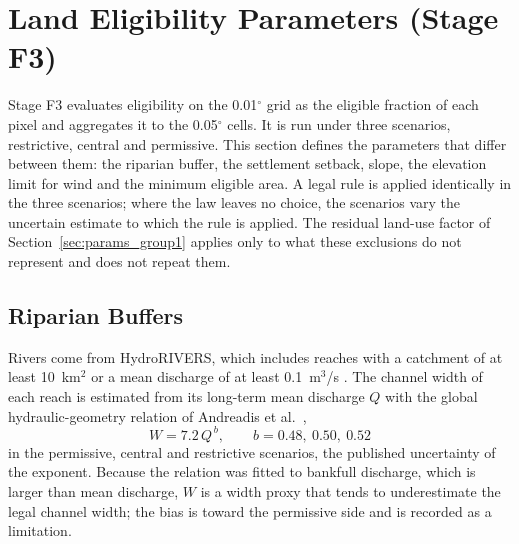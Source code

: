 
\section{Land Eligibility Parameters (Stage F3)}
\label{sec:params_group6}

Stage F3 evaluates eligibility on the 0.01$^\circ$ grid as the eligible
fraction of each pixel and aggregates it to the 0.05$^\circ$ cells. It is
run under three scenarios, restrictive, central and permissive. This
section defines the parameters that differ between them: the riparian
buffer, the settlement setback, slope, the elevation limit for wind and
the minimum eligible area. A legal rule is applied identically in the
three scenarios; where the law leaves no choice, the scenarios vary the
uncertain estimate to which the rule is applied. The residual land-use
factor of Section~\ref{sec:params_group1} applies only to what these
exclusions do not represent and does not repeat them.

\subsection{Riparian Buffers}
\label{subsec:g6_riparian}

Rivers come from HydroRIVERS, which includes reaches with a catchment of
at least 10~km$^2$ or a mean discharge of at least 0.1~m$^3$/s
\cite{lehner2013}. The channel width of each reach is estimated from its
long-term mean discharge $Q$ with the global hydraulic-geometry relation
of Andreadis et al.\ \cite{andreadis2013},
\begin{equation}
    W = 7.2\,Q^{\,b}, \qquad b = 0.48,\ 0.50,\ 0.52
    \label{eq:g6_width}
\end{equation}
in the permissive, central and restrictive scenarios, the published
uncertainty of the exponent. Because the relation was fitted to bankfull
discharge, which is larger than mean discharge, $W$ is a width proxy that
tends to underestimate the legal channel width; the bias is toward the
permissive side and is recorded as a limitation.


